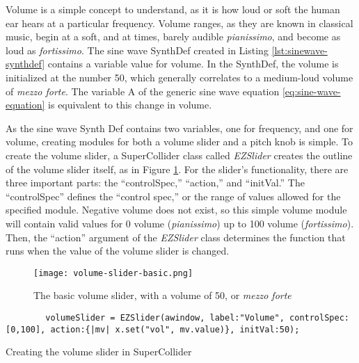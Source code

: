Volume is a simple concept to understand, as it is how loud or soft the human ear hears at a particular frequency. Volume ranges, as they are known in classical music, begin at a soft, and at times, barely audible \textit{pianissimo}, and become as loud as \textit{fortissimo}. The sine wave SynthDef created in Listing \ref{lst:sinewave-synthdef} contains a variable value for volume. In the SynthDef, the volume is initialized at the number 50, which generally correlates to a medium-loud volume of \textit{mezzo forte}. The variable A of the generic sine wave equation \ref{eq:sine-wave-equation} is equivalent to this change in volume.

As the sine wave Synth Def contains two variables, one for frequency, and one for volume, creating modules for both a volume slider and a pitch knob is simple. To create the volume slider, a SuperCollider class called \textit{EZSlider} creates the outline of the volume slider itself, as in Figure \ref{fig:volume-slider-basic}. For the slider's functionality, there are three important parts: the ``controlSpec,'' ``action,'' and ``initVal.'' The ``controlSpec'' defines the ``control spec,'' or the range of values allowed for the specified module. Negative volume does not exist, so this simple volume module will contain valid values for 0 volume (\textit{pianissimo}) up to 100 volume (\textit{fortissimo}). Then, the ``action'' argument of the \textit{EZSlider} class determines the function that runs when the value of the volume slider is changed. 

\begin{figure}[h]
  \centering
  \texttt{[image: volume-slider-basic.png]}
  \caption{The basic volume slider, with a volume of 50, or \textit{mezzo forte}}
  \label{fig:volume-slider-basic}
\end{figure}

\begin{listing}
	\begin{lstlisting}
		volumeSlider = EZSlider(awindow, label:"Volume", controlSpec:[0,100], action:{|mv| x.set("vol", mv.value)}, initVal:50);
	\end{lstlisting}
	\caption{Creating the volume slider in SuperCollider}
	\label{lst:volume-slider-waveform}
\end{listing}

